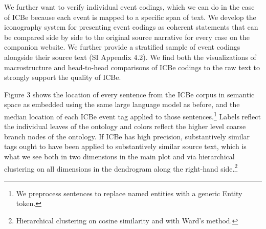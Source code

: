 \documentclass{article}
\begin{document}
We further want to verify individual event codings, which we can do in
the case of ICBe because each event is mapped to a specific span of
text. We develop the iconography system for presenting event codings as
coherent statements that can be compared side by side to the original
source narrative for every case on the companion website. We further
provide a stratified sample of event codings alongside their source text
(SI Appendix 4.2). We find both the visualizations of macrostructure and
head-to-head comparisons of ICBe codings to the raw text to strongly
support the quality of ICBe.

Figure 3 shows the location of every sentence from the ICBe corpus in
semantic space as embedded using the same large language model as
before, and the median location of each ICBe event tag applied to those
sentences.\footnote{We preprocess sentences to replace named entities
  with a generic Entity token.} Labels reflect the individual leaves of
the ontology and colors reflect the higher level coarse branch nodes of
the ontology. If ICBe has high precision, substantively similar tags
ought to have been applied to substantively similar source text, which
is what we see both in two dimensions in the main plot and via
hierarchical clustering on all dimensions in the dendrogram along the
right-hand side.\footnote{Hierarchical clustering on cosine similarity
  and with Ward's method.}
\end{document}
